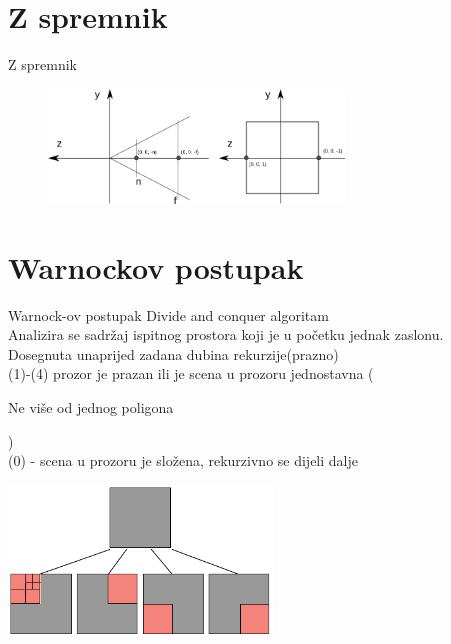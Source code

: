 \documentclass[9pt]{beamer}
\begin{document}
\section{Z spremnik}
\begin{frame}{Z spremnik}
	\begin{figure}
		\centering
		\includegraphics[width=0.7\textwidth]{slike/p04_07.png}
	\end{figure}
\end{frame}
\section{Warnockov postupak}

\begin{frame}{Warnock-ov postupak}
	Divide and conquer algoritam\\
	Analizira se sadržaj ispitnog prostora koji je u početku jednak zaslonu.\\
	Dosegnuta unaprijed zadana dubina rekurzije(prazno)\\
	(1)-(4) prozor je prazan ili je scena u prozoru jednostavna (\begin{tiny}Ne više od jednog poligona\end{tiny})\\
	(0) - scena u prozoru je složena, rekurzivno se dijeli dalje
	\begin{center}
		\includegraphics[height=4cm]{slike/05_warnock_1.png}
	\end{center}
\end{frame}
\end{document}
